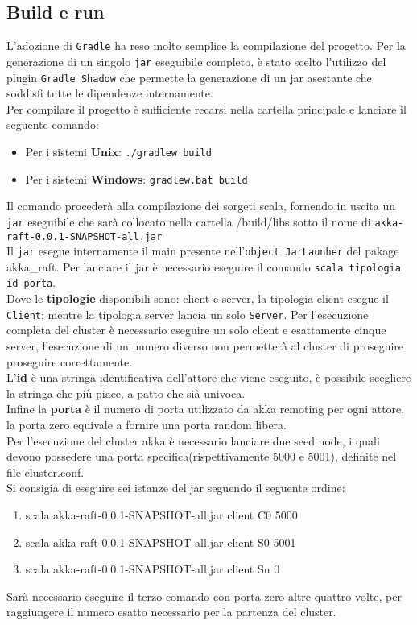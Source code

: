  	\subsection{Build e run}
	 	L'adozione di \texttt{Gradle} ha reso molto semplice la compilazione del progetto.
	 	Per la generazione di un singolo \texttt{jar} eseguibile completo, è stato scelto l'utilizzo del plugin \texttt{Gradle Shadow}\cite{GradleShadowSite} che permette la generazione di un jar asestante che soddisfi tutte le dipendenze internamente.\\
	 	Per compilare il progetto è sufficiente recarsi nella cartella principale e lanciare il seguente comando:
	 	\begin{itemize}
	 		\item Per i sistemi \textbf{Unix}: \texttt{./gradlew build} 
	 		\item Per i sistemi \textbf{Windows}: \texttt{gradlew.bat build} 
	 	\end{itemize}
		Il comando procederà alla compilazione dei sorgeti scala, fornendo in uscita un \texttt{jar} eseguibile che sarà collocato nella cartella /build/libs sotto il nome di \texttt{akka-raft-0.0.1-SNAPSHOT-all.jar}\\
		Il \texttt{jar} esegue internamente il main presente nell'\texttt{object JarLaunher} del pakage akka\_raft.
	  Per lanciare il jar è necessario eseguire il comando \texttt{scala tipologia id porta}.\\
		Dove le \textbf{tipologie} disponibili sono: client e server, la tipologia client esegue il \texttt{Client};
		mentre la tipologia server lancia un solo \texttt{Server}.
		Per l'esecuzione completa del cluster è necessario eseguire un solo client e esattamente cinque server, l'esecuzione di un numero diverso non permetterà al cluster di proseguire proseguire correttamente.\\
		L'\textbf{id} è una stringa identificativa dell'attore che viene eseguito, è possibile scegliere la stringa che più piace, a patto che sià univoca.\\
		Infine la \textbf{porta} è il numero di porta utilizzato da akka remoting per ogni attore, la porta zero equivale a fornire una porta random libera.\\
		Per l'esecuzione del cluster akka è necessario lanciare due seed node, i quali devono possedere una porta specifica(rispettivamente 5000 e 5001), definite nel file cluster.conf.\\
		Si consigia di eseguire sei istanze del jar seguendo il seguente ordine:
		  \begin{enumerate}
			  \item scala akka-raft-0.0.1-SNAPSHOT-all.jar client C0 5000
				\item scala akka-raft-0.0.1-SNAPSHOT-all.jar client S0 5001
				\item scala akka-raft-0.0.1-SNAPSHOT-all.jar client Sn 0
			\end{enumerate}	
		Sarà necessario eseguire il terzo comando con porta zero altre quattro volte, per raggiungere il numero esatto necessario per la partenza del cluster.
 
